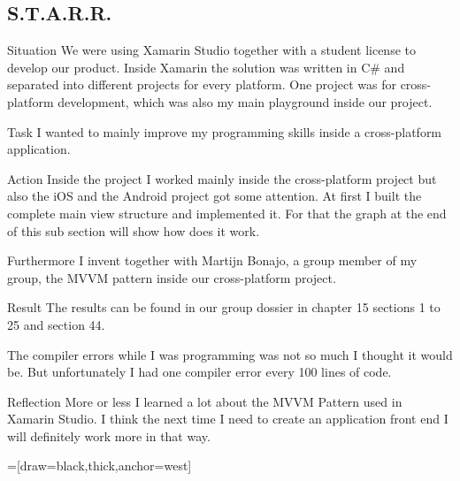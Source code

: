 	\subsection{S.T.A.R.R.}
		\begin{STARR}
			\item[Situation] We were using Xamarin Studio together with a student license to develop our product. Inside Xamarin the solution was written in C\# and separated into different projects for every platform. One project was for cross-platform development, which was also my main playground inside our project.
			\item[Task] I wanted to mainly improve my programming skills inside a cross-platform application.
			\item[Action] Inside the project I worked mainly inside the cross-platform project but also the iOS and the Android project got some attention. At first I built the complete main view structure and implemented it. For that the graph at the end of this sub section will show how does it work.

				Furthermore I invent together with Martijn Bonajo, a group member of my group, the MVVM pattern inside our cross-platform project.
				
			\item[Result] The results can be found in our group dossier in chapter 15 sections 1 to 25 and section 44.
			
				The compiler errors while I was programming was not so much I thought it would be. But unfortunately I had one compiler error every 100 lines of code.
			\item[Reflection] More or less I learned a lot about the MVVM Pattern used in Xamarin Studio. I think the next time I need to create an application front end I will definitely work more in that way.
		\end{STARR}
		
		\hspace*{4cm}
		\begin{turn}{90}
			\usetikzlibrary{trees}
			=[draw=black,thick,anchor=west]
		\end{turn}
